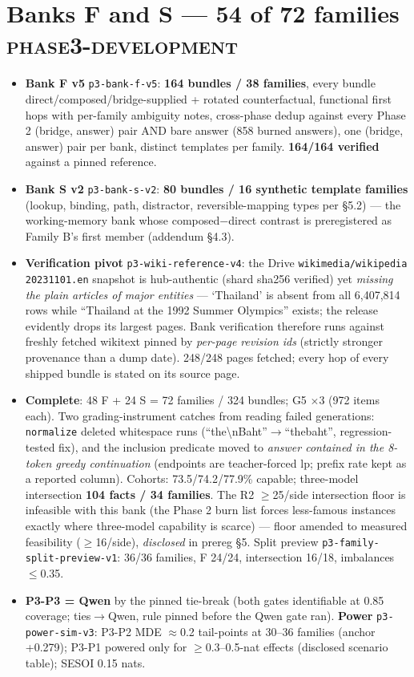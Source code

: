 \documentclass[10pt]{article}
\newcommand{\tier}[1]{\textcolor{muted}{\footnotesize\textsc{#1}}}
\newcommand{\eid}[1]{\textcolor{muted}{\footnotesize\texttt{#1}}}
\begin{document}
\section{Banks F and S --- 54 of 72 families \hfill \tier{phase3-development}}

\begin{itemize}
\item \textbf{Bank F v5} \eid{p3-bank-f-v5}: \textbf{164 bundles / 38
families}, every bundle direct/composed/bridge-supplied + rotated
counterfactual, functional first hops with per-family ambiguity notes,
cross-phase dedup against every Phase 2 (bridge, answer) pair AND bare
answer (858 burned answers), one (bridge, answer) pair per bank,
distinct templates per family. \textbf{164/164 verified} against a
pinned reference.
\item \textbf{Bank S v2} \eid{p3-bank-s-v2}: \textbf{80 bundles / 16
synthetic template families} (lookup, binding, path, distractor,
reversible-mapping types per \S5.2) --- the working-memory bank whose
composed$-$direct contrast is preregistered as Family B's first member
(addendum \S4.3).
\item \textbf{Verification pivot} \eid{p3-wiki-reference-v4}: the Drive
\texttt{wikimedia/wikipedia 20231101.en} snapshot is hub-authentic
(shard sha256 verified) yet \emph{missing the plain articles of major
entities} --- `Thailand' is absent from all 6{,}407{,}814 rows while
``Thailand at the 1992 Summer Olympics'' exists; the release evidently
drops its largest pages. Bank verification therefore runs against
freshly fetched wikitext pinned by \emph{per-page revision ids}
(strictly stronger provenance than a dump date). 248/248 pages fetched;
every hop of every shipped bundle is stated on its source page.
\item \textbf{Complete}: 48 F + 24 S = 72 families / 324 bundles; G5
$\times$3 (972 items each). Two grading-instrument catches from reading
failed generations: \texttt{normalize} deleted whitespace runs
(``the\textbackslash nBaht''$\to$``thebaht'', regression-tested fix),
and the inclusion predicate moved to \emph{answer contained in the
8-token greedy continuation} (endpoints are teacher-forced lp; prefix
rate kept as a reported column). Cohorts: 73.5/74.2/77.9\% capable;
three-model intersection \textbf{104 facts / 34 families}. The R2
$\ge$25/side intersection floor is infeasible with this bank (the
Phase 2 burn list forces less-famous instances exactly where
three-model capability is scarce) --- floor amended to measured
feasibility ($\ge$16/side), \emph{disclosed} in prereg \S5. Split
preview \eid{p3-family-split-preview-v1}: 36/36 families, F 24/24,
intersection 16/18, imbalances $\le$0.35.
\item \textbf{P3-P3 = Qwen} by the pinned tie-break (both gates
identifiable at 0.85 coverage; ties$\to$Qwen, rule pinned before the
Qwen gate ran). \textbf{Power} \eid{p3-power-sim-v3}: P3-P2 MDE
$\approx$0.2 tail-points at 30--36 families (anchor +0.279); P3-P1
powered only for $\ge$0.3--0.5-nat effects (disclosed scenario table);
SESOI 0.15 nats.
\end{itemize}
\end{document}
